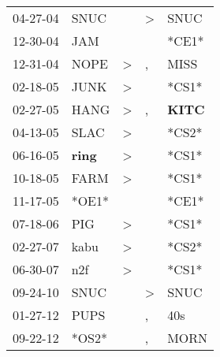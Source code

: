 \begin{supertabular}{p{0.07\textwidth}p{0.06\textwidth}p{0.02\textwidth}p{0.02\textwidth}p{0.06\textwidth}}
 04-27-04\textsuperscript{} &           SNUC\textsuperscript{} &               &  \textgreater &           SNUC\textsuperscript{} \\
 12-30-04\textsuperscript{} &            JAM\textsuperscript{} &               &               &                            *CE1* \\
 12-31-04\textsuperscript{} &           NOPE\textsuperscript{} &  \textgreater &             , &           MISS\textsuperscript{} \\
 02-18-05\textsuperscript{} &           JUNK\textsuperscript{} &  \textgreater &               &                            *CS1* \\
 02-27-05\textsuperscript{} &           HANG\textsuperscript{} &  \textgreater &             , &  \textbf{KITC\textsuperscript{}} \\
 04-13-05\textsuperscript{} &           SLAC\textsuperscript{} &  \textgreater &               &                            *CS2* \\
 06-16-05\textsuperscript{} &  \textbf{ring\textsuperscript{}} &  \textgreater &               &                            *CS1* \\
 10-18-05\textsuperscript{} &           FARM\textsuperscript{} &  \textgreater &               &                            *CS1* \\
 11-17-05\textsuperscript{} &                            *OE1* &               &               &                            *CE1* \\
 07-18-06\textsuperscript{} &            PIG\textsuperscript{} &  \textgreater &               &                            *CS1* \\
 02-27-07\textsuperscript{} &           kabu\textsuperscript{} &  \textgreater &               &                            *CS2* \\
 06-30-07\textsuperscript{} &            n2f\textsuperscript{} &  \textgreater &               &                            *CS1* \\
 09-24-10\textsuperscript{} &           SNUC\textsuperscript{} &               &  \textgreater &           SNUC\textsuperscript{} \\
 01-27-12\textsuperscript{} &           PUPS\textsuperscript{} &               &             , &            40s\textsuperscript{} \\
 09-22-12\textsuperscript{} &                            *OS2* &               &             , &           MORN\textsuperscript{} \\

\end{supertabular}
